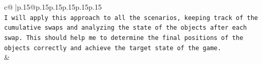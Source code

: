 \documentclass{article}
\begin{document}
{\begin{supertabular}{c@{$\;$}|p{.15\linewidth}@{}p{.15\linewidth}p{.15\linewidth}p{.15\linewidth}p{.15\linewidth}p{.15\linewidth}}
{{{\\ 
\texttt{I will apply this approach to all the scenarios, keeping track of the cumulative swaps and analyzing the state of the objects after each swap. This should help me to determine the final positions of the objects correctly and achieve the target state of the game.} \\
            }
        }
    }
    & \\ \\

\end{supertabular}
}
\end{document}
